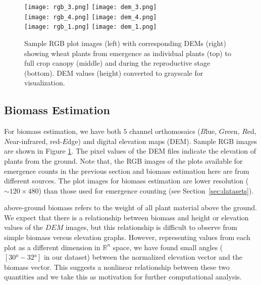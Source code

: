 \documentclass[10pt,twocolumn,letterpaper]{article}
\begin{document}
\begin{figure}[]
	\centering
	\texttt{[image: rgb\_3.png]}
	\texttt{[image: dem\_3.png]} \\
	\texttt{[image: rgb\_4.png]}
	\texttt{[image: dem\_4.png]} \\
	\texttt{[image: rgb\_1.png]}
	\texttt{[image: dem\_1.png]}
    \caption{Sample RGB plot images (left) with corresponding DEMs (right) showing wheat plants from emergence as individual plants (top) to full crop canopy (middle) and during the reproductive stage (bottom). DEM values (height) converted to grayscale for visualization.}
    \label{fig:sample_RGBE}
\end{figure}

\subsection{Biomass Estimation}

For biomass estimation, we have both $5$ channel orthomosaics ($B$lue, $G$reen, $R$ed, $N$ear-infrared, red-$E$dge) and digital elevation maps (DEM). Sample RGB images are shown in Figure \ref{fig:sample_RGBE}.  The pixel values of the DEM files indicate the elevation of plants from the ground. Note that, the RGB images of the plots available for emergence counts in the previous section and biomass estimation here are from different sources. The plot images for biomass estimation are lower resolution ($\sim120\times480$) than those used for emergence counting (see Section~\ref{sec:datasets}).


above-ground biomass refers to the weight of all plant material above the ground. We expect that there is a relationship between biomass and height or elevation values of the $DEM$ images, but this relationship is difficult to observe from simple biomass versus elevation graphs. However, representing values from each plot as a different dimension in $\mathbb{R}^n$ space, we have found small angles ($[30\si{\degree}-32\si{\degree}]$ in our dataset) between the normalized elevation vector and the biomass vector. This suggests a nonlinear relationship between these two quantities and we take this as motivation for further computational analysis.
\end{document}
